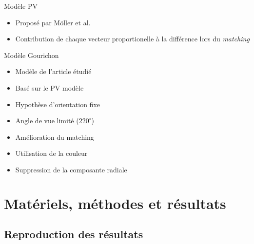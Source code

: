 \documentclass{beamer}
\begin{document}
\begin{frame}
  \begin{block}{Modèle PV}
    \begin{itemize}
      \item Proposé par Möller et al. \cite{Lambrinos2000}
      \item Contribution de chaque vecteur proportionelle à la différence lors du \textit{matching}
    \end{itemize}
  \end{block}
  \begin{block}{Modèle Gourichon}
    \begin{itemize}
      \item Modèle de l'article étudié
      \item Basé sur le PV modèle
      \item Hypothèse d'orientation fixe
      \item Angle de vue limité ($220^{\circ}$)
      \item Amélioration du matching
      \item Utilisation de la couleur 
      \item Suppression de la composante radiale
    \end{itemize}
  \end{block}
\end{frame}

\section{Matériels, méthodes et résultats}

\subsection{Reproduction des résultats}
\end{document}
